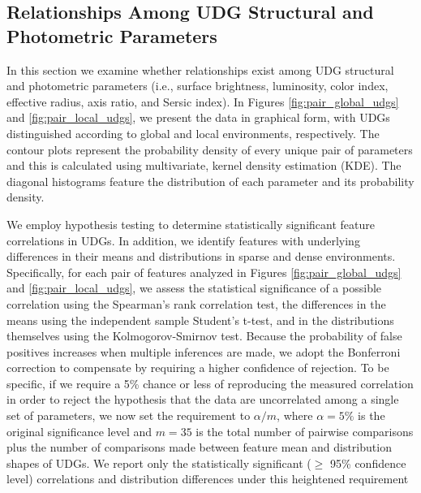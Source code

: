 \documentclass[twocolumn,tighten]{aastex63}
\begin{document}
\subsection{Relationships Among UDG Structural and Photometric Parameters}



In this section we examine whether relationships exist among UDG structural and photometric parameters (i.e., surface brightness, luminosity, color index, effective radius, axis ratio, and Sersic index).
In Figures \ref{fig:pair_global_udgs} and \ref{fig:pair_local_udgs}, we present the data in graphical form, with UDGs distinguished according to global and local environments, respectively.
The contour plots represent the probability density of every unique pair of parameters and this is calculated using multivariate, kernel density estimation (KDE). The diagonal histograms feature the distribution of each parameter and its probability density.

We employ hypothesis testing to determine statistically significant feature correlations in UDGs. In addition, we identify features with underlying differences in their means and distributions in sparse and dense environments.
Specifically, for each pair of features analyzed in Figures \ref{fig:pair_global_udgs} and \ref{fig:pair_local_udgs}, we assess the statistical significance of a possible correlation using the Spearman's rank correlation test, the differences in the means using the independent sample Student's t-test, and in the distributions themselves using the Kolmogorov-Smirnov test. 
Because the probability of false positives increases when multiple inferences are made, we adopt the Bonferroni correction to compensate by requiring a higher confidence of rejection. To be specific, if we require a 5\% chance or less of reproducing the measured correlation in order to reject the hypothesis that the data are uncorrelated among a single set of parameters, we now set the requirement to $\alpha/m$, where $\alpha=5\%$ is the original significance level and $m=35$ is the total number of pairwise comparisons plus the number of comparisons made between feature mean and distribution shapes of UDGs.
We report only the statistically significant ($\ge$ 95\% confidence level) correlations and distribution differences under this heightened requirement
\end{document}
